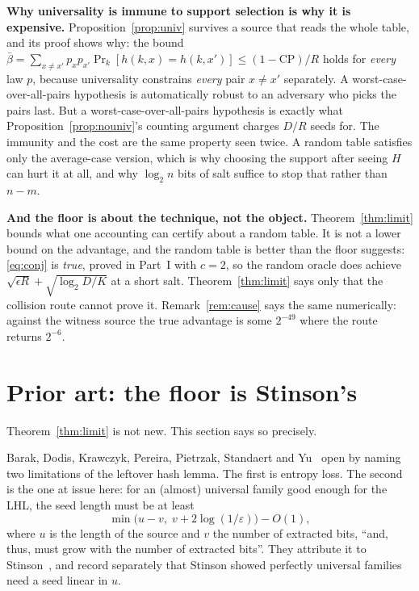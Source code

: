 \documentclass{aicr-solution}
\newcommand{\CP}{\mathrm{CP}}
\begin{document}
\medskip
\noindent\textbf{Why universality is immune to support selection is why it is expensive.}
Proposition~\ref{prop:univ} survives a source that reads the whole table, and its proof shows why:
the bound
$\bar\beta = \sum_{x \ne x'} p_x p_{x'}\Pr_k[h(k,x) = h(k,x')] \le (1-\CP)/R$ holds for
\emph{every} law $p$, because universality constrains \emph{every} pair $x \ne x'$ separately. A
worst-case-over-all-pairs hypothesis is automatically robust to an adversary who picks the pairs
last. But a worst-case-over-all-pairs hypothesis is exactly what Proposition~\ref{prop:nouniv}'s counting
argument charges $D/R$ seeds for. The immunity and the cost are the same property seen twice. A
random table satisfies only the average-case version, which is why choosing the support after
seeing $H$ can hurt it at all, and why $\log_2 n$ bits of salt suffice to stop that rather than
$n - m$.

\medskip
\noindent\textbf{And the floor is about the technique, not the object.} Theorem~\ref{thm:limit}
bounds what one accounting can certify about a random table. It is not a lower bound on the
advantage, and the random table is better than the floor suggests: \eqref{eq:conj} is
\emph{true}, proved in Part~I with $c = 2$, so the random oracle does achieve
$\sqrt{\epsilon R} + \sqrt{\log_2 D/K}$ at a short salt. Theorem~\ref{thm:limit} says only that the
collision route cannot prove it. Remark~\ref{rem:cause} says the same numerically: against the
witness source the true advantage is some $2^{-49}$ where the route returns $2^{-6}$.



\section{Prior art: the floor is Stinson's}\label{sec:prior}

Theorem~\ref{thm:limit} is not new. This section says so precisely.

Barak, Dodis, Krawczyk, Pereira, Pietrzak, Standaert and Yu~\cite{BDKPPSY11} open by naming two
limitations of the leftover hash lemma. The first is entropy loss. The second is the one at issue
here: for an (almost) universal family good enough for the LHL, the seed length must be at least
\[
  \min\bigl(u - v,\; v + 2\log(1/\varepsilon)\bigr) - O(1) ,
\]
where $u$ is the length of the source and $v$ the number of extracted bits, ``and, thus, must grow
with the number of extracted bits''. They attribute it to Stinson~\cite{Sti94}, and record
separately that Stinson showed perfectly universal families need a seed linear in $u$.
\end{document}
